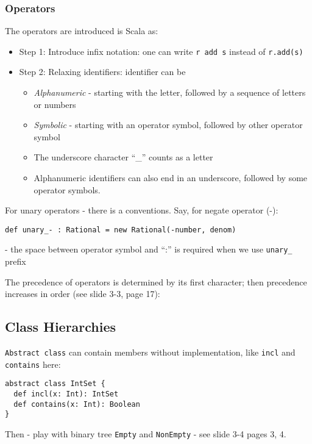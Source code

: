 \documentclass{scrartcl}
\newcommand{\term}[1]{\verb~#1~} %
\begin{document}
\subsubsection{Operators}
\label{sec:Operators}

The operators are introduced is Scala as:
\begin{itemize}
\item Step 1: Introduce infix notation: one can write \lstinline|r add s|
  instead of \lstinline|r.add(s)|
\item Step 2: Relaxing identifiers: identifier can be
  \begin{itemize}
  \item {\it Alphanumeric} - starting with the letter, followed by a sequence of
    letters or numbers
  \item {\it Symbolic} - starting with an operator symbol, followed by other
    operator symbol
  \item The underscore character ``\_'' counts as a letter
  \item Alphanumeric identifiers can also end in an underscore, followed by some
    operator symbols.
  \end{itemize}
\end{itemize}

For unary operators - there is a conventions. Say, for negate operator (-):
\begin{lstlisting}
def unary_- : Rational = new Rational(-number, denom)
\end{lstlisting}
- the space between operator symbol and ``:'' is required when we use
\lstinline|unary_ | prefix

The precedence of operators is determined by its first character; then
precedence increases in order (see slide 3-3, page 17):

\subsection{Class Hierarchies}
\label{sec:ClassHierarchies}

\term{Abstract class} can contain members without implementation, like
\lstinline|incl| and \lstinline|contains| here:
\begin{lstlisting}
abstract class IntSet {
  def incl(x: Int): IntSet
  def contains(x: Int): Boolean
}
\end{lstlisting}

Then - play with binary tree \lstinline|Empty| and \lstinline|NonEmpty| - see
slide 3-4 pages 3, 4.
\end{document}
